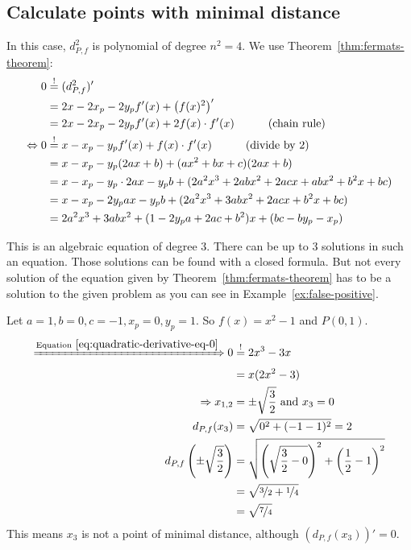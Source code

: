 \subsection{Calculate points with minimal distance}
In this case, $d_{P,f}^2$ is polynomial of degree $n^2 = 4$. 
We use Theorem~\ref{thm:fermats-theorem}:\nobreak
\begin{align}
    0     &\overset{!}{=} (d_{P,f}^2)'\\
          &= 2x -2 x_p -2y_p f'(x) + \left (f(x)^2 \right )'\\
          &= 2x -2 x_p -2y_p f'(x) + 2 f(x) \cdot f'(x) \rlap{\hspace*{3em}(chain rule)}\label{eq:minimizingFirstDerivative}\\
\Leftrightarrow 0 &\overset{!}{=} x -x_p -y_p f'(x) + f(x) \cdot f'(x) \rlap{\hspace*{3em}(divide by 2)}\label{eq:minimizingFirstDerivative}\\
          &= x -x_p -y_p (2ax+b) + (ax^2+bx+c)(2ax+b)\\
          &= x -x_p -y_p \cdot 2ax- y_p b + (2 a^2 x^3+2 a b x^2+2 a c x+ab x^2+b^2 x+bc)\\
          &= x -x_p -2y_p ax- y_p b + (2a^2 x^3 + 3 ab x^2 + 2acx + b^2 x + bc)\\
          &= 2a^2 x^3 + 3 ab x^2 + (1 -2y_p a+ 2ac + b^2)x +(bc-by_p-x_p)\label{eq:quadratic-derivative-eq-0}
\end{align}

This is an algebraic equation of degree 3.
There can be up to 3 solutions in such an equation. Those solutions
can be found with a closed formula. But not every solution of the
equation given by Theorem~\ref{thm:fermats-theorem}
has to be a solution to the given problem as you can see in
Example~\ref{ex:false-positive}.
\goodbreak
\begin{example}\label{ex:false-positive}
    Let $a = 1,  b = 0,  c=-1, x_p= 0, y_p = 1$.
    So $f(x) = x^2 - 1$ and $P(0, 1)$.
    \begin{align}
        \xRightarrow{\text{Equation}~\ref{eq:quadratic-derivative-eq-0}} 0 &\stackrel{!}{=} 2x^3 - 3x\\
        &= x(2x^2-3)\\
        \Rightarrow x_{1,2} &= \pm \sqrt{\frac{3}{2}} \text{ and } x_3 = 0\\
        d_{P,f}(x_3) &= \sqrt{0^2 + (-1-1)^2} = 2\\
        d_{P,f} \left (\pm \sqrt{\frac{3}{2}} \right ) &= \sqrt{\left (\sqrt{\frac{3}{2} - 0} \right )^2 + \left (\frac{1}{2}-1 \right )^2}\\
            &= \sqrt{\nicefrac{3}{2}+\nicefrac{1}{4}} \\
            &= \sqrt{\nicefrac{7}{4}}\\
    \end{align}
    This means $x_3$ is not a point of minimal distance, although
    $(d_{P,f}(x_3))' = 0$.
\end{example}


